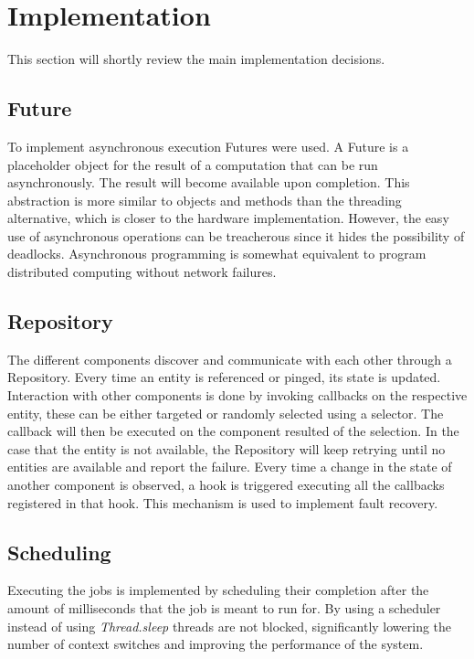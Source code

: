 \section{Implementation}
This section will shortly review the main implementation decisions.

\subsection{Future}
To implement asynchronous execution Futures were used.
A Future is a placeholder object for the result of a computation that can be run asynchronously. The result will become available upon completion. This abstraction is more similar to objects and methods than the threading alternative, which is closer to the hardware implementation.
However, the easy use of asynchronous operations can be treacherous since it hides the possibility of deadlocks. Asynchronous programming is somewhat equivalent to program distributed computing without network failures.

\subsection{Repository}
The different components discover and communicate with each other through a Repository. Every time an entity is referenced or pinged, its state is updated. Interaction with other components is done by invoking callbacks on the respective entity, these can be either targeted or randomly selected using a selector. The callback will then be executed on the component resulted of the selection. In the case that the entity is not available, the Repository will keep retrying until no entities are available and report the failure. Every time a change in the state of another component is observed, a hook is triggered executing all the callbacks registered in that hook. This mechanism is used to implement fault recovery.

\subsection{Scheduling}
Executing the jobs is implemented by scheduling their completion after the amount of milliseconds that the job is meant to run for.
By using a scheduler instead of using \textit{Thread.sleep} threads are not blocked, significantly lowering the number of context switches and improving the performance of the system.
